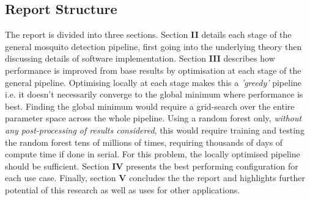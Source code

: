     \subsection{Report Structure}
    \label{subsec:bg-intro-structure}
        The report is divided into three sections. Section \textbf{II} details each stage of the general mosquito detection pipeline, first going into the underlying theory then discussing details of software implementation. Section \textbf{III} describes how performance is improved from base results by optimisation at each stage of the general pipeline. Optimising locally at each stage makes this a \textit{'greedy'} pipeline i.e. it doesn't necessarily converge to the global minimum where performance is best. Finding the global minimum would require a grid-search over the entire parameter space across the whole pipeline. Using a random forest only, \textit{without any post-processing of results considered}, this would require training and testing the random forest tens of millions of times, requiring thousands of days of compute time if done in serial. 
        For this problem, the locally optimised pipeline should be sufficient. Section \textbf{IV} presents the best performing configuration for each use case. Finally, section \textbf{V} concludes the the report and highlights further potential of this research as well as uses for other applications. 

